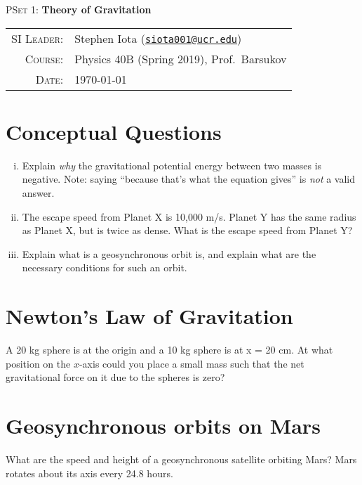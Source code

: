 \documentclass[11pt]{article}
\newcommand{\email}[1]{\texttt{\href{mailto:#1}{#1}}}
\begin{document}
\begin{center}

\Large{\textsc{PSet 1}: \textbf{Theory of Gravitation}}
\end{center}
\vspace{.5mm}



\begin{tabular}{rl}
\textsc{SI Leader}:
&
Stephen Iota (\email{siota001@ucr.edu})
\\
\textsc{Course}:
&
Physics 40B (Spring 2019), Prof.~Barsukov
\\
\textsc{Date}:
&
\today
\end{tabular}



\section{Conceptual Questions}

\begin{enumerate}[(i)]
	\item Explain \textit{why} the gravitational potential energy between two masses is negative. Note: saying ``because that's what the equation gives'' is \textit{not} a valid answer. 
	\item The escape speed from Planet X is 10,000 m/s. Planet Y has the same radius as Planet X, but is twice as dense. What is the escape speed from Planet Y?
	\item Explain what is a geosynchronous orbit is, and explain what are the necessary conditions for such an orbit. 
\end{enumerate}

\section{Newton's Law of Gravitation}

A 20 kg sphere is at the origin and a 10 kg sphere is at x = 20 cm. At what position on the $x$-axis could you place a small mass such that the net gravitational force on it due to the spheres is zero?
 
 
 
 \section{Geosynchronous orbits on Mars}
 What are the speed and height of a geosynchronous satellite orbiting Mars? Mars rotates about its axis every 24.8 hours. 
\end{document}
